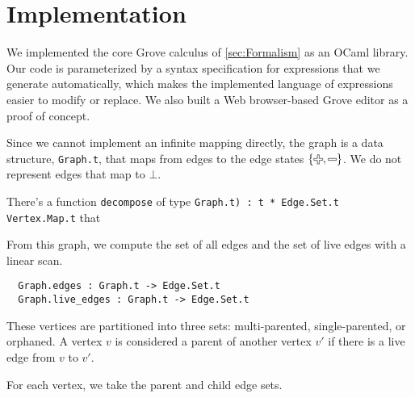 
\section{Implementation}%
\label{sec:Implementation}






We implemented the core Grove calculus of \autoref{sec:Formalism} as an OCaml library.
Our code is parameterized by a syntax specification for expressions that we generate automatically, which makes the implemented language of expressions easier to modify or replace.
We also built a Web browser-based Grove editor as a proof of concept.

Since we cannot implement an infinite mapping directly, the graph is a data structure, \texttt{Graph.t}, that maps from edges to the edge states $\left\{\Plus, \Minus\right\}$.
We do not represent edges that map to $\bot$.


There's a function \verb!decompose! of type \verb!Graph.t) : t * Edge.Set.t Vertex.Map.t! that 

From this graph, we compute the set of all edges and the set of live edges with a linear scan.


\begin{verbatim}
  Graph.edges : Graph.t -> Edge.Set.t
  Graph.live_edges : Graph.t -> Edge.Set.t
\end{verbatim}


These vertices are partitioned into three sets: multi-parented, single-parented, or orphaned.
A vertex $v$ is considered a parent of another vertex $v'$ if there is a live edge from $v$ to $v'$.

For each vertex, we take the parent and child edge sets.

